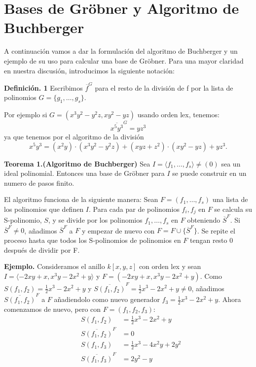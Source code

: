 \section{Bases de Gröbner y Algoritmo de Buchberger}

A continuación vamos a dar la formulación del algoritmo de Buchberger y un ejemplo de su uso para calcular una base de Gröbner.
Para una mayor claridad en nuestra discusión, introducimos la siguiente notación:

\textbf{Definición. 1} Escribimos $\overline{f}^{G}$ para el resto de la división de f por la lista de polinomios $G=\lbrace g_{1},\dots,g_{s}\rbrace$.

Por ejemplo si $G=\left(x^3y^2-y^2z,xy^2-yz \right) $ usando orden lex, tenemos:
\[
\overline{x^{5}y^{3}}^{G} = yz^{3}
\]
ya que tenemos por el algoritmo de la división
\[
x^5y^3 = (x^2y)\cdot (x^3y^2-y^2z)+(xyz +z^2)\cdot (xy^2-yz)+yz^3.
\]

\textbf{Teorema 1.(Algoritmo de Buchberger)} Sea $I = \langle f_{1},\dots,f_{s}\rangle \neq (0)$ sea un ideal polinomial. Entonces una base de Gröbner para $I$ se puede construir en un numero de pasos finito.

El algoritmo funciona de la siguiente manera: Sean $F = (f_{1},\dots,f_{s})$ una lista de los polinomios que definen $I$. Para cada par de polinomios $f_{i}, f_{j}$ en $F$ se calcula su S-polinomio, $S$, y se divide por los polinomios  $f_{1},\dots,f_{s}$ en $F$ obteniendo $\overline{S}^{F}$. Si $\overline{S}^{F} \neq 0 $, añadimos $\overline{S}^{F}$ a $F$ y empezar de nuevo con $F = F\cup\lbrace\overline{S}^{F}\rbrace$. Se repite el proceso hasta que todos los S-polinomios de polinomios en $F$ tengan resto 0 después de dividir por F.

\textbf{Ejemplo.}
Consideramos el anillo $k[x,y,z]$ con orden lex y sean $I = \langle -2xy +x,x^3y-2x^2+y\rangle$ y $F = (-2xy +x, x^3y-2x^2+y)$. Como $S(f_{1},f_{2})= \frac{1}{2}x^3-2x^2+y$ y $\overline{S(f_{1},f_{2})}^{F}= \frac{1}{2}x^3-2x^2+y \neq 0$, añadimos $\overline{S(f_{1},f_{2})}^{F}$ a $F$ añadiendolo como nuevo generador $f_{3}= \frac{1}{2}x^3-2x^2+y$. Ahora comenzamos de nuevo, pero con $F=(f_{1},f_{2},f_{3})$:
\begin{eqnarray}
\nonumber &S(f_{1},f_{2})& = \frac{1}{2}x^3-2x^2+y \\
\nonumber &\overline{S(f_{1},f_{2})}^{F}& = 0\\
\nonumber &S(f_{1},f_{3})& = \frac{1}{2}x^3-4x^2y+2y^2 \\
\nonumber &\overline{S(f_{1},f_{3})}^{F}& = 2y^2-y
\end{eqnarray}

